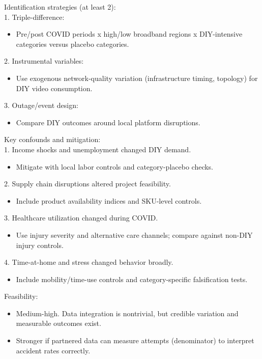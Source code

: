\documentclass[11pt]{article}
\begin{document}
Identification strategies (at least 2):\\
1. Triple-difference:\\
\begin{itemize}
\item Pre/post COVID periods x high/low broadband regions x DIY-intensive categories versus placebo categories.
\end{itemize}
2. Instrumental variables:\\
\begin{itemize}
\item Use exogenous network-quality variation (infrastructure timing, topology) for DIY video consumption.
\end{itemize}
3. Outage/event design:\\
\begin{itemize}
\item Compare DIY outcomes around local platform disruptions.
\end{itemize}

Key confounds and mitigation:\\
1. Income shocks and unemployment changed DIY demand.\\
\begin{itemize}
\item Mitigate with local labor controls and category-placebo checks.
\end{itemize}
2. Supply chain disruptions altered project feasibility.\\
\begin{itemize}
\item Include product availability indices and SKU-level controls.
\end{itemize}
3. Healthcare utilization changed during COVID.\\
\begin{itemize}
\item Use injury severity and alternative care channels; compare against non-DIY injury controls.
\end{itemize}
4. Time-at-home and stress changed behavior broadly.\\
\begin{itemize}
\item Include mobility/time-use controls and category-specific falsification tests.
\end{itemize}

Feasibility:\\
\begin{itemize}
\item Medium-high. Data integration is nontrivial, but credible variation and measurable outcomes exist.
\item Stronger if partnered data can measure attempts (denominator) to interpret accident rates correctly.
\end{itemize}
\end{document}
